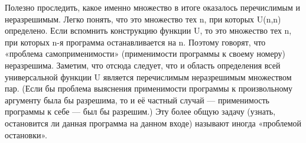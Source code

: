 Полезно проследить, какое именно множество в итоге оказалось перечислимым и неразрешимым. Легко понять, что это множество тех n, при которых U(n,n) определено. Если вспомнить конструкцию функции U, то это множество тех n, при которых n-я программа останавливается на n. Поэтому говорят, что «проблема самоприменимости» (применимости программы к своему номеру) неразрешима. Заметим, что отсюда следует, что и область определения всей универсальной функции U является перечислимым неразрешимым множеством пар. (Если бы проблема выяснения применимости программы к произвольному аргументу была бы разрешима, то и её частный случай — применимость программы к себе — был бы разрешим.) Эту более общую задачу (узнать, остановится ли данная программа на данном входе) называют иногда «проблемой остановки».